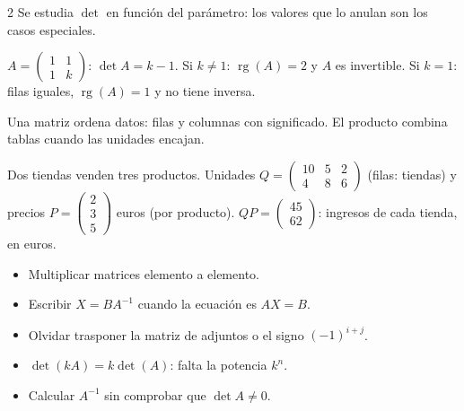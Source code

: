 \documentclass[10pt]{article}
\begin{document}
\begin{multicols}{2}
Se estudia \(\det\) en función del parámetro: los valores que lo anulan son los casos especiales.
\begin{ejemplo}
\(A=\begin{pmatrix}1&1\\1&k\end{pmatrix}\): \(\det A=k-1\).
Si \(k\ne1\): \(\operatorname{rg}(A)=2\) y \(A\) es invertible.
Si \(k=1\): filas iguales, \(\operatorname{rg}(A)=1\) y no tiene inversa.
\end{ejemplo}

Una matriz ordena datos: filas y columnas con significado. El producto combina tablas cuando las unidades encajan.
\begin{ejemplo}
Dos tiendas venden tres productos. Unidades \(Q=\begin{pmatrix}10&5&2\\4&8&6\end{pmatrix}\) (filas: tiendas) y precios \(P=\begin{pmatrix}2\\3\\5\end{pmatrix}\) euros (por producto). \(QP=\begin{pmatrix}45\\62\end{pmatrix}\): ingresos de cada tienda, en euros.
\end{ejemplo}

\begin{ojo}
\begin{itemize}
  \item Multiplicar matrices elemento a elemento.
  \item Escribir \(X=BA^{-1}\) cuando la ecuación es \(AX=B\).
  \item Olvidar trasponer la matriz de adjuntos o el signo \((-1)^{i+j}\).
  \item \(\det(kA)=k\det(A)\): falta la potencia \(k^n\).
  \item Calcular \(A^{-1}\) sin comprobar que \(\det A\ne0\).
\end{itemize}
\end{ojo}

\end{multicols}
\end{document}
